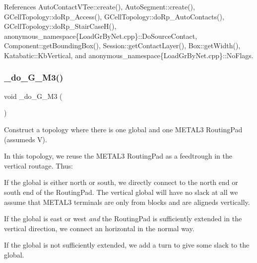  

References Auto\+Contact\+V\+Tee\+::create(), Auto\+Segment\+::create(), G\+Cell\+Topology\+::do\+Rp\+\_\+\+Access(), G\+Cell\+Topology\+::do\+Rp\+\_\+\+Auto\+Contacts(), G\+Cell\+Topology\+::do\+Rp\+\_\+\+Stair\+Case\+H(), anonymous\+\_\+namespace\{\+Load\+Gr\+By\+Net.\+cpp\}\+::\+Do\+Source\+Contact, Component\+::get\+Bounding\+Box(), Session\+::get\+Contact\+Layer(), Box\+::get\+Width(), Katabatic\+::\+Kb\+Vertical, and anonymous\+\_\+namespace\{\+Load\+Gr\+By\+Net.\+cpp\}\+::\+No\+Flags.

\mbox{\label{group__LoadGlobalRouting_ga2519ef984b3d19f123827a9b12651672}} 
\subsubsection{\texorpdfstring{\+\_\+do\+\_\+G\+\_\+M3()}{\_do\_1G\_1M3()}}
{\footnotesize\ttfamily void \+\_\+do\+\_\+G\+\_\+M3 (\begin{DoxyParamCaption}{ }\end{DoxyParamCaption})\hspace{0.3cm}{\ttfamily [private]}}

Construct a topology where there is one global and one {\ttfamily M\+E\+T\+A\+L3} Routing\+Pad (assumeds V).

In this topology, we reuse the {\ttfamily M\+E\+T\+A\+L3} Routing\+Pad as a feedtrough in the vertical routage. Thus\+:
\begin{DoxyItemize}
\item If the global is either north or south, we directly connect to the north end or south end of the Routing\+Pad. The vertical global will have no slack at all we assume that M\+E\+T\+A\+L3 terminals are only from blocks and are aligneds vertically.
\item If the global is east or west {\itshape and} the Routing\+Pad is sufficiently extended in the vertical direction, we connect an horizontal in the normal way.
\item If the global is not sufficiently extended, we add a turn to give some slack to the global.
\end{DoxyItemize}

 

